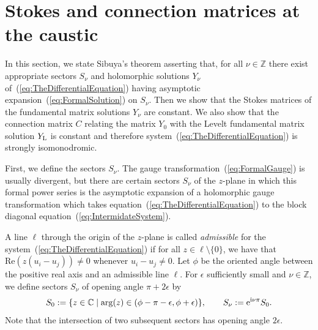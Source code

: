 \documentclass[pdftex]{sigma}
\numberwithin{equation}{section}
\begin{document}
\section{Stokes and connection matrices at the caustic}
\label{sec:StokesMatrices}
In this section, we state Sibuya's theorem asserting that, for all $\nu\in\mathbb{Z}$ there exist appropriate sectors $S_{\nu}$ and holomorphic solutions $Y_{\nu}$ of~(\ref{eq:TheDifferentialEquation}) having asymptotic expansion~(\ref{eq:FormalSolution}) on $S_{\nu}$. Then we show that the Stokes matrices of the fundamental matrix solutions $Y_{\nu}$ are constant. We also show that the connection matrix $C$ relating the matrix $Y_{0}$ with the Levelt fundamental matrix solution $Y_{\rm L}$ is constant and therefore system~(\ref{eq:TheDifferentialEquation}) is strongly isomonodromic.

First, we define the sectors $S_{\nu}$. The gauge transformation~(\ref{eq:FormalGauge}) is usually divergent, but there are certain sectors $S_{\nu}$ of the $z$-plane in which this formal power series is the asymptotic expansion of a holomorphic gauge transformation which takes equation~(\ref{eq:TheDifferentialEquation}) to the block diagonal equation~(\ref{eq:IntermidateSystem}).
\begin{Definition}
 A line $\ell$ through the origin of the $z$-plane is called \emph{admissible} for the system~(\ref{eq:TheDifferentialEquation}) if for all $z\in\ell\setminus\{ 0 \}$, we have that $\mathrm{Re}(z(u_{i}-u_{j}))\neq 0$ whenever $u_{i}-u_{j}\neq 0$. Let $\phi$ be the oriented angle between the positive real axis and an admissible line $\ell$. For $\epsilon$ sufficiently small and $\nu\in\mathbb{Z}$, we define sectors $S_{\nu}$ of opening angle $\pi+2\epsilon$ by
 \begin{equation*}
 S_{0}:=\{z\in\mathbb{C}\mid \arg(z)\in(\phi-\pi-\epsilon,\phi+\epsilon)\},\qquad
 S_{\nu}:={\rm e}^{{\rm i}\nu\pi}S_{0}.
 \end{equation*}
Note that the intersection of two subsequent sectors has opening angle $2\epsilon$.
\end{Definition}
\end{document}
